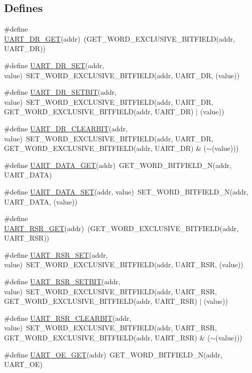 \subsection*{Defines}
\begin{DoxyCompactItemize}
\item 
\#define \hyperlink{a00574_a1d8113f4e7065c73a0830eee47762811}{UART\_\-DR\_\-GET}(addr)~(GET\_\-WORD\_\-EXCLUSIVE\_\-BITFIELD(addr, UART\_\-DR))
\item 
\#define \hyperlink{a00574_aaa39ce24dd66798e268a66c42dbe4961}{UART\_\-DR\_\-SET}(addr, value)~SET\_\-WORD\_\-EXCLUSIVE\_\-BITFIELD(addr, UART\_\-DR, (value))
\item 
\#define \hyperlink{a00574_a2a2a0b19691877ef94be7d5c3c01945c}{UART\_\-DR\_\-SETBIT}(addr, value)~SET\_\-WORD\_\-EXCLUSIVE\_\-BITFIELD(addr, UART\_\-DR, GET\_\-WORD\_\-EXCLUSIVE\_\-BITFIELD(addr, UART\_\-DR) $|$ (value))
\item 
\#define \hyperlink{a00574_a52b94e3d89d86370ae52c4e04774d557}{UART\_\-DR\_\-CLEARBIT}(addr, value)~SET\_\-WORD\_\-EXCLUSIVE\_\-BITFIELD(addr, UART\_\-DR, GET\_\-WORD\_\-EXCLUSIVE\_\-BITFIELD(addr, UART\_\-DR) \& ($\sim$(value)))
\item 
\#define \hyperlink{a00574_a9510e01c634417acb8476623a9c7e6f4}{UART\_\-DATA\_\-GET}(addr)~GET\_\-WORD\_\-BITFIELD\_\-N(addr, UART\_\-DATA)
\item 
\#define \hyperlink{a00574_a2964caa0a4c0bce21281bf7b843e0b8c}{UART\_\-DATA\_\-SET}(addr, value)~SET\_\-WORD\_\-BITFIELD\_\-N(addr, UART\_\-DATA, (value))
\item 
\#define \hyperlink{a00574_a59e91148121bbfe62d10638b6742bb02}{UART\_\-RSR\_\-GET}(addr)~(GET\_\-WORD\_\-EXCLUSIVE\_\-BITFIELD(addr, UART\_\-RSR))
\item 
\#define \hyperlink{a00574_ab38497bbc86f69b045a191b87aae0096}{UART\_\-RSR\_\-SET}(addr, value)~SET\_\-WORD\_\-EXCLUSIVE\_\-BITFIELD(addr, UART\_\-RSR, (value))
\item 
\#define \hyperlink{a00574_ad6fbebd3cbcf52aafa8f296f31d77140}{UART\_\-RSR\_\-SETBIT}(addr, value)~SET\_\-WORD\_\-EXCLUSIVE\_\-BITFIELD(addr, UART\_\-RSR, GET\_\-WORD\_\-EXCLUSIVE\_\-BITFIELD(addr, UART\_\-RSR) $|$ (value))
\item 
\#define \hyperlink{a00574_a86bbbc8297f0ed57f7d97278a6c9f457}{UART\_\-RSR\_\-CLEARBIT}(addr, value)~SET\_\-WORD\_\-EXCLUSIVE\_\-BITFIELD(addr, UART\_\-RSR, GET\_\-WORD\_\-EXCLUSIVE\_\-BITFIELD(addr, UART\_\-RSR) \& ($\sim$(value)))
\item 
\#define \hyperlink{a00574_a21eb57f2c5878c538af90df2f4aac0c4}{UART\_\-OE\_\-GET}(addr)~GET\_\-WORD\_\-BITFIELD\_\-N(addr, UART\_\-OE)

\end{DoxyCompactItemize}
